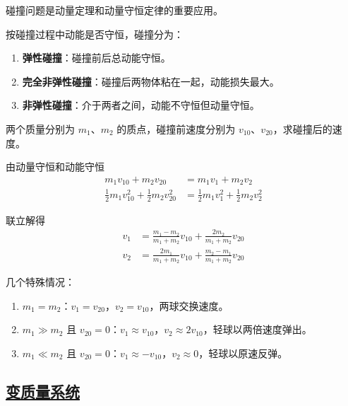 碰撞问题是动量定理和动量守恒定律的重要应用。

\begin{definition}[碰撞的分类]
    按碰撞过程中动能是否守恒，碰撞分为：
    \begin{enumerate}
        \item \textbf{弹性碰撞}：碰撞前后总动能守恒。
        \item \textbf{完全非弹性碰撞}：碰撞后两物体粘在一起，动能损失最大。
        \item \textbf{非弹性碰撞}：介于两者之间，动能不守恒但动量守恒。
    \end{enumerate}
\end{definition}

\begin{example}[一维弹性碰撞]
    两个质量分别为 $m_1$、$m_2$ 的质点，碰撞前速度分别为 $v_{10}$、$v_{20}$，求碰撞后的速度。
    \begin{solution}
        由动量守恒和动能守恒
        \begin{align}
            m_1 v_{10} + m_2 v_{20} &= m_1 v_1 + m_2 v_2 \\
            \frac{1}{2}m_1 v_{10}^2 + \frac{1}{2}m_2 v_{20}^2 &= \frac{1}{2}m_1 v_1^2 + \frac{1}{2}m_2 v_2^2
        \end{align}
        
        联立解得
        \begin{align}
            v_1 &= \frac{m_1 - m_2}{m_1 + m_2}v_{10} + \frac{2m_2}{m_1 + m_2}v_{20} \\
            v_2 &= \frac{2m_1}{m_1 + m_2}v_{10} + \frac{m_2 - m_1}{m_1 + m_2}v_{20}
        \end{align}
        
        几个特殊情况：
        \begin{enumerate}
            \item $m_1 = m_2$：$v_1 = v_{20}$，$v_2 = v_{10}$，两球交换速度。
            \item $m_1 \gg m_2$ 且 $v_{20} = 0$：$v_1 \approx v_{10}$，$v_2 \approx 2v_{10}$，轻球以两倍速度弹出。
            \item $m_1 \ll m_2$ 且 $v_{20} = 0$：$v_1 \approx -v_{10}$，$v_2 \approx 0$，轻球以原速反弹。
        \end{enumerate}
    \end{solution}
\end{example}

\subsection{\protect\hyperlink{:}{变质量系统}}

